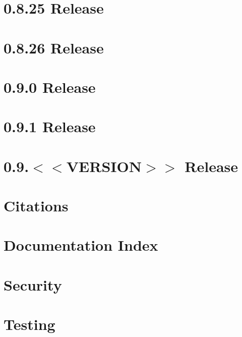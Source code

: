\let\mypdfximage\pdfximage\def\pdfximage{\immediate\mypdfximage}\documentclass[twoside]{book}
\newcommand{\+}{\discretionary{\mbox{\scriptsize$\hookleftarrow$}}{}{}}
\begin{document}
\chapter{0.8.25 Release}
\label{doc_news_2018-11-18_0_8_25_md}

\chapter{0.8.26 Release}
\label{doc_news_2019-02-26_0_8_26_md}

\chapter{0.9.0 Release}
\label{doc_news_2019-08-06_0_9_0_md}

\chapter{0.9.1 Release}
\label{doc_news_2019-11-26_0_9_1_md}

\chapter{0.9.$<$$<$V\+E\+R\+S\+I\+ON$>$$>$ Release}
\label{doc_news__preparation_next_release_md}

\chapter{Citations}
\label{doc_paper_README_md}

\chapter{Documentation Index}
\label{doc_README_md}

\chapter{Security}
\label{doc_SECURITY_md}

\chapter{Testing}
\label{doc_TESTING_md}

\end{document}
